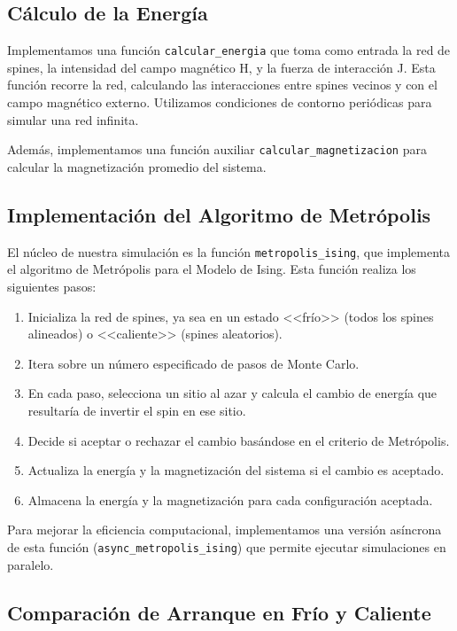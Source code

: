 \documentclass[twocolumn]{article}
\begin{document}
\subsection*{Cálculo de la Energía}

Implementamos una función \texttt{calcular\_energia} que toma como entrada la red de spines, la intensidad del campo magnético H, y la fuerza de interacción J. Esta función recorre la red, calculando las interacciones entre spines vecinos y con el campo magnético externo. Utilizamos condiciones de contorno periódicas para simular una red infinita.

Además, implementamos una función auxiliar \texttt{calcular\_magnetizacion} para calcular la magnetización promedio del sistema.


\subsection*{Implementación del Algoritmo de Metrópolis}

El núcleo de nuestra simulación es la función \texttt{metropolis\_ising}, que implementa el algoritmo de Metrópolis para el Modelo de Ising. Esta función realiza los siguientes pasos:

\begin{enumerate}
    \item Inicializa la red de spines, ya sea en un estado <<frío>> (todos los spines alineados) o <<caliente>> (spines aleatorios).
    \item Itera sobre un número especificado de pasos de Monte Carlo.
    \item En cada paso, selecciona un sitio al azar y calcula el cambio de energía que resultaría de invertir el spin en ese sitio.
    \item Decide si aceptar o rechazar el cambio basándose en el criterio de Metrópolis.
    \item Actualiza la energía y la magnetización del sistema si el cambio es aceptado.
    \item Almacena la energía y la magnetización para cada configuración aceptada.
\end{enumerate}

Para mejorar la eficiencia computacional, implementamos una versión asíncrona de esta función (\texttt{async\_metropolis\_ising}) que permite ejecutar simulaciones en paralelo.

\subsection*{Comparación de Arranque en Frío y Caliente}
\end{document}
